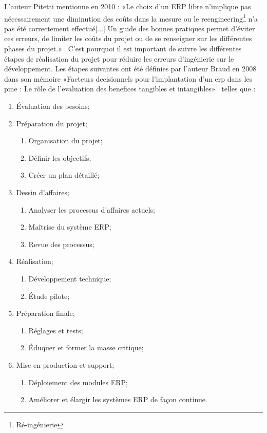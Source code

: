 L'auteur Pitetti mentionne en 2010 : «Le choix d’un ERP libre n’implique pas nécessairement une diminution des coûts dans la mesure ou le reengineering\footnote{Ré-ingénierie} n’a pas été correctement effectué[...] Un guide des bonnes pratiques permet d’éviter ces erreurs, de limiter les coûts du projet ou de se renseigner sur les différentes phases du projet.»~\cite{pitetti2010implementation} C'est pourquoi il est important de suivre les différentes étapes de réalisation du projet pour réduire les erreurs d'ingénierie sur le développement. Les étapes suivantes ont été définies par l'auteur Braud en 2008 dans son mémoire «Facteurs decisionnels pour l’implantation d’un erp dans les pme : Le rôle de l’evaluation des benefices tangibles et intangibles»~\cite{uqam_erp_benefice_2008} telles que :
\begin{enumerate}
    \item Évaluation des besoins;
    \item Préparation du projet;
    \begin{enumerate}
        \item Organisation du projet;
        \item Définir les objectifs;
        \item Créer un plan détaillé;
    \end{enumerate}
    \item Dessin d’affaires;
    \begin{enumerate}
        \item Analyser les processus d’affaires actuels;
        \item Maîtrise du système ERP;
        \item Revue des processus;
    \end{enumerate}
    \item Réalisation;
    \begin{enumerate}
        \item Développement technique;
        \item Étude pilote;
    \end{enumerate}
    \item Préparation finale;
    \begin{enumerate}
        \item Réglages et tests;
        \item Éduquer et former la masse critique;
    \end{enumerate}
    \item Mise en production et support;
    \begin{enumerate}
        \item Déploiement des modules ERP;
        \item Améliorer et élargir les systèmes ERP de façon continue.
    \end{enumerate}
\end{enumerate}

